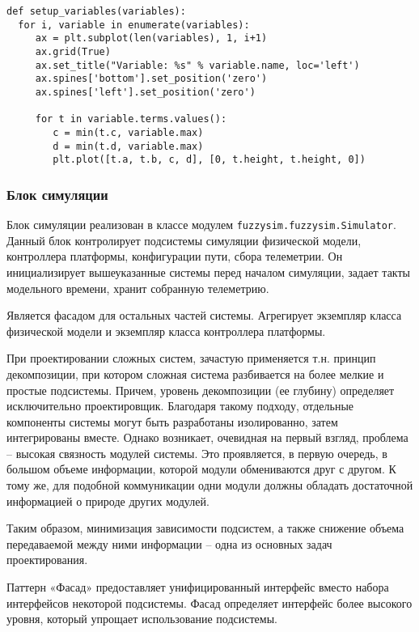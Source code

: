 \begin{lstlisting}[style=pythonstyle,caption={  }, label=lst:func:1]
def setup_variables(variables):
  for i, variable in enumerate(variables):
     ax = plt.subplot(len(variables), 1, i+1)
     ax.grid(True)
     ax.set_title("Variable: %s" % variable.name, loc='left')
     ax.spines['bottom'].set_position('zero')
     ax.spines['left'].set_position('zero')

     for t in variable.terms.values():
        c = min(t.c, variable.max)
        d = min(t.d, variable.max)
        plt.plot([t.a, t.b, c, d], [0, t.height, t.height, 0])
\end{lstlisting}

\subsubsection{Блок симуляции}


Блок симуляции реализован в классе модулем \lstinline!fuzzysim.fuzzysim.Simulator!. Данный блок контролирует подсистемы симуляции физической модели, контроллера платформы, конфигурации пути, сбора телеметрии. Он инициализирует вышеуказанные системы перед началом симуляции, задает такты модельного времени, хранит собранную телеметрию.

Является фасадом для остальных частей системы. Агрегирует экземпляр класса физической модели и экземпляр класса контроллера платформы.

При проектировании сложных систем, зачастую применяется т.н. принцип декомпозиции, при котором сложная система разбивается на более мелкие и простые подсистемы. Причем, уровень декомпозиции (ее глубину) определяет исключительно проектировщик. Благодаря такому подходу, отдельные компоненты системы могут быть разработаны изолированно, затем интегрированы вместе. Однако возникает, очевидная на первый взгляд, проблема – высокая связность модулей системы. Это проявляется, в первую очередь, в большом объеме информации, которой модули обмениваются друг с другом. К тому же, для подобной коммуникации одни модули должны обладать достаточной информацией о природе других модулей.

Таким образом, минимизация зависимости подсистем, а также снижение объема передаваемой между ними информации – одна из основных задач проектирования.

Паттерн «Фасад» предоставляет унифицированный интерфейс вместо набора интерфейсов некоторой подсистемы. Фасад определяет интерфейс более высокого уровня, который упрощает использование подсистемы.

